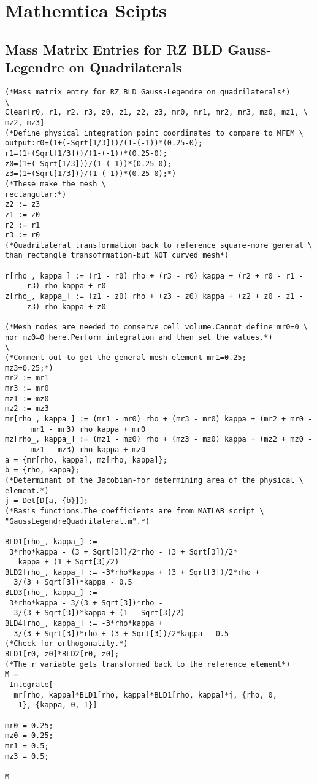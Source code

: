 \documentclass{article}
\begin{document}
\section{Mathemtica Scipts}
\subsection{Mass Matrix Entries for RZ BLD Gauss-Legendre on Quadrilaterals}

\begin{verbatim}
(*Mass matrix entry for RZ BLD Gauss-Legendre on quadrilaterals*)
\
Clear[r0, r1, r2, r3, z0, z1, z2, z3, mr0, mr1, mr2, mr3, mz0, mz1, \
mz2, mz3]
(*Define physical integration point coordinates to compare to MFEM \
output:r0=(1+(-Sqrt[1/3]))/(1-(-1))*(0.25-0);
r1=(1+(Sqrt[1/3]))/(1-(-1))*(0.25-0);
z0=(1+(-Sqrt[1/3]))/(1-(-1))*(0.25-0);
z3=(1+(Sqrt[1/3]))/(1-(-1))*(0.25-0);*)
(*These make the mesh \
rectangular:*)
z2 := z3
z1 := z0
r2 := r1
r3 := r0
(*Quadrilateral transformation back to reference square-more general \
than rectangle transofrmation-but NOT curved mesh*)

r[rho_, kappa_] := (r1 - r0) rho + (r3 - r0) kappa + (r2 + r0 - r1 - 
     r3) rho kappa + r0
z[rho_, kappa_] := (z1 - z0) rho + (z3 - z0) kappa + (z2 + z0 - z1 - 
     z3) rho kappa + z0

(*Mesh nodes are needed to conserve cell volume.Cannot define mr0=0 \
nor mz0=0 here.Perform integration and then set the values.*)
\
(*Comment out to get the general mesh element mr1=0.25;
mz3=0.25;*)
mr2 := mr1
mr3 := mr0
mz1 := mz0
mz2 := mz3
mr[rho_, kappa_] := (mr1 - mr0) rho + (mr3 - mr0) kappa + (mr2 + mr0 -
      mr1 - mr3) rho kappa + mr0
mz[rho_, kappa_] := (mz1 - mz0) rho + (mz3 - mz0) kappa + (mz2 + mz0 -
      mz1 - mz3) rho kappa + mz0
a = {mr[rho, kappa], mz[rho, kappa]};
b = {rho, kappa};
(*Determinant of the Jacobian-for determining area of the physical \
element.*)
j = Det[D[a, {b}]];
(*Basis functions.The coefficients are from MATLAB script \
"GaussLegendreQuadrilateral.m".*)

BLD1[rho_, kappa_] := 
 3*rho*kappa - (3 + Sqrt[3])/2*rho - (3 + Sqrt[3])/2*
   kappa + (1 + Sqrt[3]/2)
BLD2[rho_, kappa_] := -3*rho*kappa + (3 + Sqrt[3])/2*rho + 
  3/(3 + Sqrt[3])*kappa - 0.5
BLD3[rho_, kappa_] := 
 3*rho*kappa - 3/(3 + Sqrt[3])*rho - 
  3/(3 + Sqrt[3])*kappa + (1 - Sqrt[3]/2)
BLD4[rho_, kappa_] := -3*rho*kappa + 
  3/(3 + Sqrt[3])*rho + (3 + Sqrt[3])/2*kappa - 0.5
(*Check for orthogonality.*)
BLD1[r0, z0]*BLD2[r0, z0];
(*The r variable gets transformed back to the reference element*)
M = 
 Integrate[
  mr[rho, kappa]*BLD1[rho, kappa]*BLD1[rho, kappa]*j, {rho, 0, 
   1}, {kappa, 0, 1}]

mr0 = 0.25;
mz0 = 0.25;
mr1 = 0.5;
mz3 = 0.5;

M
\end{verbatim}
\end{document}
